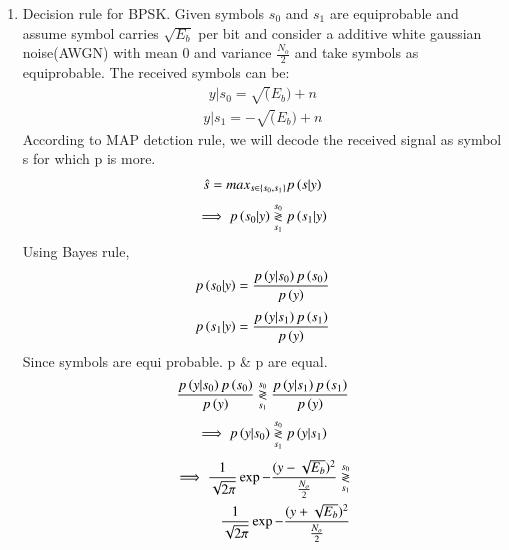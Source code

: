 \begin{enumerate}[label=\thesubsection.\arabic*.,ref=\thesubsection.\theenumi]
\item Decision rule for BPSK.
\newline
Given symbols $s_0$ and $ s_1$ are equiprobable and assume symbol carries $\sqrt{E_b}$ per bit and consider a  additive white gaussian noise(AWGN) with mean 0 and variance $\frac{N_o}{2}$ and take  symbols as equiprobable. The received symbols can be:
\begin{align}
    y|s_0 = \sqrt(E_b) + n
    \label{eq:ee18btech11042_1}
\end{align}
\begin{align}
    y|s_1 = -\sqrt(E_b) + n
    \label{eq:ee18btech11042_2}
\end{align}
According to MAP detction rule, we will decode the received signal  as symbol s for which  p is more.
\begin{align}
    \hat{s} = max_{s \in  \left\{s_0,s_1\right\}} p\left(s|y\right)
    \label{eq:ee18btech11042_3}
\end{align}
\begin{align}
    \implies p\left(s_0|y\right) \overset{s_0}{\underset{s_1}{\gtrless}} p\left(s_1|y\right)
    \label{eq:ee18btech11042_4}
\end{align}
Using Bayes rule,
\begin{align}
    p\left(s_0|y\right) = \frac{p\left(y|s_0\right)p\left(s_0\right)}{p\left(y\right)}
    \label{eq:ee18btech11042_5}
\end{align}
\begin{align}
    p\left(s_1|y\right) = \frac{p\left(y|s_1\right)p\left(s_1\right)}{p\left(y\right)}
    \label{eq:ee18btech11042_6}
\end{align}
Since symbols are equi probable. p \&  p are equal.
\begin{align}
    \frac{p\left(y|s_0\right)p\left(s_0\right)}{p\left(y\right)} \overset{s_0}{\underset{s_1}{\gtrless}}  \frac{p\left(y|s_1\right)p\left(s_1\right)}{p\left(y\right)}
    \label{eq:ee18btech11042_7}
\end{align}
\begin{align}
    \implies p\left(y|s_0\right) \overset{s_0}{\underset{s_1}{\gtrless}} p\left(y|s_1\right)
    \label{eq:ee18btech11042_8}
\end{align}
\begin{align}
    \implies \frac{1}{\sqrt{2\pi}} \exp{-\frac{(y-\sqrt{E_b})^2}{\frac{N_o}{2}}}  \overset{s_0}{\underset{s_1}{\gtrless}}   
\\
    \frac{1}{\sqrt{2\pi}} \exp{-\frac{(y+\sqrt{E_b})^2}{\frac{N_o}{2}}}
    \label{eq:ee18btech11042_9}
\end{align}


\end{enumerate}
